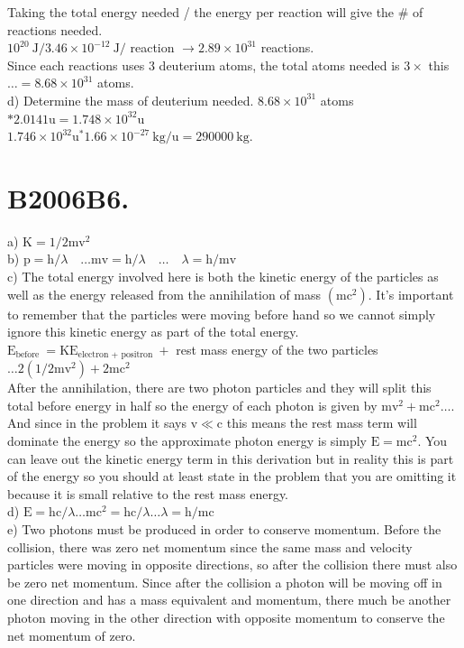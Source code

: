 \begin{enumerate}
Taking the total energy needed / the energy per reaction will give the $\#$ of reactions needed.\\
$10^{20} \mathrm{~J} / 3.46 \times 10^{-12} \mathrm{~J} /$ reaction $\rightarrow 2.89 \times 10^{31}$ reactions.\\
Since each reactions uses 3 deuterium atoms, the total atoms needed is $3 \times$ this $\ldots=8.68 \times 10^{31}$ atoms.\\
d) Determine the mass of deuterium needed. $8.68 \times 10^{31}$ atoms $* 2.0141 \mathrm{u}=1.748 \times 10^{32} \mathrm{u}$\\
$1.746 \times 10^{32} \mathrm{u}^{*} 1.66 \times 10^{-27} \mathrm{~kg} / \mathrm{u}=290000 \mathrm{~kg}$.

\section*{B2006B6.}
a) $\mathrm{K}=1 / 2 \mathrm{mv}^{2}$\\
b) $\mathrm{p}=\mathrm{h} / \lambda \quad \ldots \mathrm{mv}=\mathrm{h} / \lambda \quad \ldots \quad \lambda=\mathrm{h} / \mathrm{mv}$\\
c) The total energy involved here is both the kinetic energy of the particles as well as the energy released from the annihilation of mass $\left(\mathrm{mc}^{2}\right)$. It's important to remember that the particles were moving before hand so we cannot simply ignore this kinetic energy as part of the total energy.\\
$\mathrm{E}_{\text {before }}=\mathrm{KE}_{\text {electron }+ \text { positron }}+$ rest mass energy of the two particles $\ldots 2\left(1 / 2 \mathrm{mv}^{2}\right)+2 \mathrm{mc}^{2}$\\
After the annihilation, there are two photon particles and they will split this total before energy in half so the energy of each photon is given by $\mathrm{mv}^{2}+\mathrm{mc}^{2} \ldots$. And since in the problem it says $\mathrm{v} \ll \mathrm{c}$ this means the rest mass term will dominate the energy so the approximate photon energy is simply $\mathrm{E}=\mathrm{mc}^{2}$. You can leave out the kinetic energy term in this derivation but in reality this is part of the energy so you should at least state in the problem that you are omitting it because it is small relative to the rest mass energy.\\
d) $\mathrm{E}=\mathrm{hc} / \lambda \ldots \mathrm{mc}^{2}=\mathrm{hc} / \lambda \ldots \lambda=\mathrm{h} / \mathrm{mc}$\\
e) Two photons must be produced in order to conserve momentum. Before the collision, there was zero net momentum since the same mass and velocity particles were moving in opposite directions, so after the collision there must also be zero net momentum. Since after the collision a photon will be moving off in one direction and has a mass equivalent and momentum, there much be another photon moving in the other direction with opposite momentum to conserve the net momentum of zero.


\end{enumerate}
